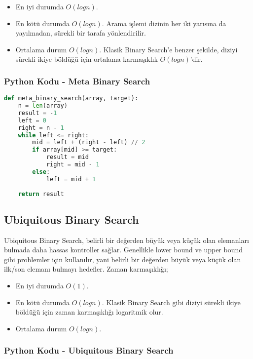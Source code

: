 \begin{itemize}
    \item En iyi durumda $O(logn)$.
    \item En kötü durumda $O(logn)$. Arama işlemi dizinin her iki yarısına da yayılmadan, sürekli bir tarafa yönlendirilir.
    \item Ortalama durum $O(logn)$. Klasik Binary Search’e benzer şekilde, diziyi sürekli ikiye böldüğü için ortalama karmaşıklık $O(logn)$'dir.
\end{itemize}

\subsubsection{Python Kodu - Meta Binary Search}

\begin{lstlisting}[language=Python]
def meta_binary_search(array, target):
    n = len(array)
    result = -1
    left = 0
    right = n - 1
    while left <= right:
        mid = left + (right - left) // 2
        if array[mid] >= target:
            result = mid
            right = mid - 1
        else:
            left = mid + 1
    
    return result
\end{lstlisting}

\newpage

\subsection{Ubiquitous Binary Search}

Ubiquitous Binary Search, belirli bir değerden büyük veya küçük olan elemanları bulmada daha hassas kontroller sağlar. Genellikle lower bound ve upper bound gibi problemler için kullanılır, yani belirli bir değerden büyük veya küçük olan ilk/son elemanı bulmayı hedefler. Zaman karmaşıklığı;

\begin{itemize}
    \item En iyi durumda $O(1)$.
    \item En kötü durumda $O(logn)$. Klasik Binary Search gibi diziyi sürekli ikiye böldüğü için zaman karmaşıklığı logaritmik olur.
    \item Ortalama durum $O(logn)$.
\end{itemize}

\subsubsection{Python Kodu - Ubiquitous Binary Search}

